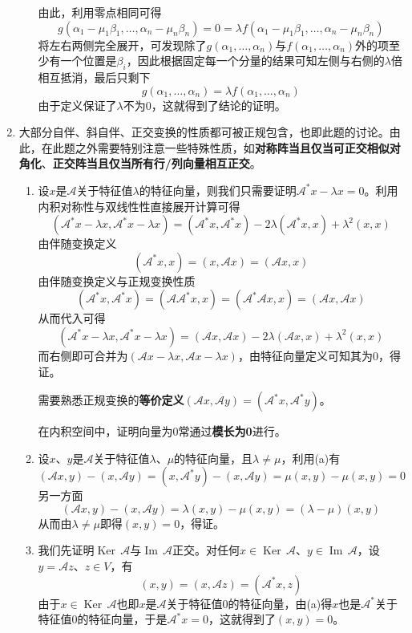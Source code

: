 \documentclass[a4paper,UTF8,fontset=windows,AutoFakeBold]{ctexart}
\DeclareMathOperator{\im}{Im\,}
\DeclareMathOperator{\Ker}{Ker\,}
\newcommand*{\ma}{\mathcal{A}}
\newcommand*{\note}{\noindent *}
\begin{document}
\begin{enumerate}
\begin{enumerate}
        由此，利用零点相同可得
        $$g(\alpha_1-\mu_1\beta_1,\dots,\alpha_n-\mu_n\beta_n)=0=\lambda f(\alpha_1-\mu_1\beta_1,\dots,\alpha_n-\mu_n\beta_n)$$
        将左右两侧完全展开，可发现除了$g(\alpha_1,\dots,\alpha_n)$与$f(\alpha_1,\dots,\alpha_n)$外的项至少有一个位置是$\beta_i$，因此根据固定每一个分量的结果可知左侧与右侧的$\lambda$倍相互抵消，最后只剩下
        $$g(\alpha_1,\dots,\alpha_n)=\lambda f(\alpha_1,\dots,\alpha_n)$$
        由于定义保证了$\lambda$不为0，这就得到了结论的证明。
    \end{enumerate}

    \item
    \note 大部分自伴、斜自伴、正交变换的性质都可被正规包含，也即此题的讨论。由此，在此题之外需要特别注意一些特殊性质，如\textbf{对称阵当且仅当可正交相似对角化}、\textbf{正交阵当且仅当所有行/列向量相互正交}。
    \begin{enumerate}
        \item 设$x$是$\ma$关于特征值$\lambda$的特征向量，则我们只需要证明$\ma^*x-\lambda x=0$。利用内积对称性与双线性性直接展开计算可得
        $$(\ma^*x-\lambda x,\ma^*x-\lambda x)=(\ma^*x,\ma^*x)-2\lambda(\ma^*x,x)+\lambda^2(x,x)$$
        由伴随变换定义
        $$(\ma^*x,x)=(x,\ma x)=(\ma x,x)$$
        由伴随变换定义与正规变换性质
        $$(\ma^*x,\ma^*x)=(\ma\ma^*x,x)=(\ma^*\ma x,x)=(\ma x,\ma x)$$
        从而代入可得
        $$(\ma^*x-\lambda x,\ma^*x-\lambda x)=(\ma x,\ma x)-2\lambda(\ma x,x)+\lambda^2(x,x)$$
        而右侧即可合并为$(\ma x-\lambda x,\ma x-\lambda x)$，由特征向量定义可知其为0，得证。

        \note 需要熟悉正规变换的\textbf{等价定义}$(\ma x,\ma y)=(\ma^*x,\ma^*y)$。

        \note 在内积空间中，证明向量为0常通过\textbf{模长为0}进行。

        \item 设$x$、$y$是$\ma$关于特征值$\lambda$、$\mu$的特征向量，且$\lambda\ne\mu$，利用(a)有
        $$(\ma x,y)-(x,\ma y)=(x,\ma^*y)-(x,\ma y)=\mu(x,y)-\mu(x,y)=0$$
        另一方面
        $$(\ma x,y)-(x,\ma y)=\lambda(x,y)-\mu(x,y)=(\lambda-\mu)(x,y)$$
        从而由$\lambda\ne\mu$即得$(x,y)=0$，得证。

        \item 
        我们先证明$\Ker\ma$与$\im\ma$正交。对任何$x\in\Ker\ma$、$y\in\im\ma$，设$y=\ma z$、$z\in V$，有
        $$(x,y)=(x,\ma z)=(\ma^*x,z)$$
        由于$x\in\Ker\ma$也即$x$是$\ma$关于特征值0的特征向量，由(a)得$x$也是$\ma^*$关于特征值0的特征向量，于是$\ma^*x=0$，这就得到了$(x,y)=0$。
        

\end{enumerate}
\end{enumerate}
\end{document}
